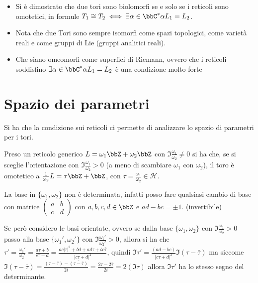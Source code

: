 
\begin{osservazione}
\begin{itemize}
\item Si è dimostrato che due tori sono biolomorfi se e solo se i reticoli sono omotetici, in formule $T_1\cong T_2 \iff \exists \alpha\in\bbC^* \alpha L_1=L_2$.
\item Nota che due Tori sono sempre isomorfi come spazi topologici, come varietà reali e come gruppi di Lie (gruppi analitici reali).
\item Che siano omeomorfi come superfici di Riemann, ovvero che i reticoli soddisfino $\exists \alpha\in\bbC^* \alpha L_1=L_2$  è una condizione molto forte
\end{itemize}
\end{osservazione}


\section{Spazio dei parametri}
Si ha che la condizione sui reticoli ci permette di analizzare lo spazio di parametri per i tori.

Preso un reticolo generico $L=\omega_1 \bbZ + \omega_2 \bbZ$ con $\Im \frac{\omega_1}{\omega_2} \ne 0$ si ha che, se si sceglie l'orientazione con $\Im \frac{\omega_1}{\omega_2}>0$ (a meno di scambiare $\omega_1$ con $\omega_2$), il toro è omotetico a $\frac{1}{\omega_2} L= \tau \bbZ+ \bbZ$, con $\tau=\frac{\omega_1}{\omega_2} \in \mathcal{H}$.

La base in $\{\omega_1, \omega_2 \}$ non è determinata, infatti posso fare qualsiasi cambio di base con matrice $	\begin{pmatrix} a & b \\ c & d \end{pmatrix}$ con $a,b,c,d \in \bbZ$ e $ad-bc=\pm 1$. (invertibile)

Se però considero le basi orientate, ovvero se dalla base $\{\omega_1, \omega_2 \}$ con $\Im \frac{\omega_1}{\omega_2}>0$ passo alla base $\{\omega_1', \omega_2' \}$ con $\Im \frac{\omega_1'}{\omega_2'}>0$, allora si ha che $\tau'=\frac{\omega_1'}{\omega_2'}=\frac{a\tau +b}{c\tau+d}=\frac{ac |\tau |^2+bd+ad\tau +bc \bar\tau}{|c\tau+d|^2}$, quindi $\Im\tau'=\frac{(ad-bc)}{ |c\tau+d|^2} \Im(\tau-\bar\tau)$ ma siccome $\Im(\tau-\bar\tau)=\frac{(\tau-\bar\tau)-\overline{(\tau-\bar\tau)}}{2i}=\frac{2\tau-2\bar\tau}{2i}=2(\Im\tau)$ allora $\Im\tau'$ ha lo stesso segno del determinante.


